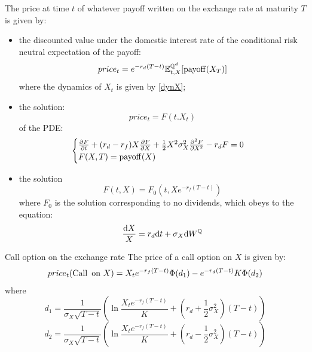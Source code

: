 \begin{proposition}
    The price at time $t$ of whatever payoff written on the exchange rate at maturity $T$ is given by:
    \begin{itemize}
    \item the discounted value under the domestic interest rate of the conditional risk neutral expectation of the payoff:
    \begin{equation}
    price_t = e^{-r_d(T-t)}\mathbb{E}^{\mathbb{Q}^d}_{t,X}[\operatorname{payoff}(X_T)]
    \end{equation}
    where the dynamics of $X_t$ is given by \eqref{dynX};
    \item the solution:
    \begin{equation}
        price_t = F(t.X_t) 
    \end{equation}
    of the PDE:
    \begin{equation}
        \begin{cases}
        \pdv{F}{t} + (r_d-r_f)X\pdv{F}{X} + \frac{1}{2}X^2\sigma_X^2\pdv[2]{F}{X} - r_dF = 0\\
        F(X,T) = \operatorname{payoff}(X)
        \end{cases}
    \end{equation}
    \item the solution \begin{equation}
        F(t,X) = F_0(t,Xe^{-r_f(T-t)}) 
    \end{equation}
    where $F_0$ is the solution corresponding to no dividends, which obeys to the equation:
    \begin{equation}
        \frac{\dd X}{X} = r_d\dd t + \sigma_X\dd W^{\mathbb{Q}}
    \end{equation}
    \end{itemize}
\end{proposition}
\begin{example}{Call option on the exchange rate}{}{}
    The price of a call option on $X$ is given by:
   \begin{align}
       price_t(\operatorname{Call}\text{ on } X) = X_t e^{-r_f(T-t)}\Phi(d_1) - e^{-r_d(T-t)}K\Phi(d_2)
   \end{align}
   where
   \begin{equation}
       d_1 = \frac{1}{\sigma_X\sqrt{T-t}}\left(\ln\frac{X_te^{-r_f(T-t)}}{K}+\left(r_d+\frac{1}{2}\sigma_X^2\right)(T-t)\right)
   \end{equation}
   \begin{equation}
       d_2 = \frac{1}{\sigma_X\sqrt{T-t}}\left(\ln\frac{X_te^{-r_f(T-t)}}{K}+\left(r_d-\frac{1}{2}\sigma_X^2\right)(T-t)\right)
   \end{equation}
\end{example}
